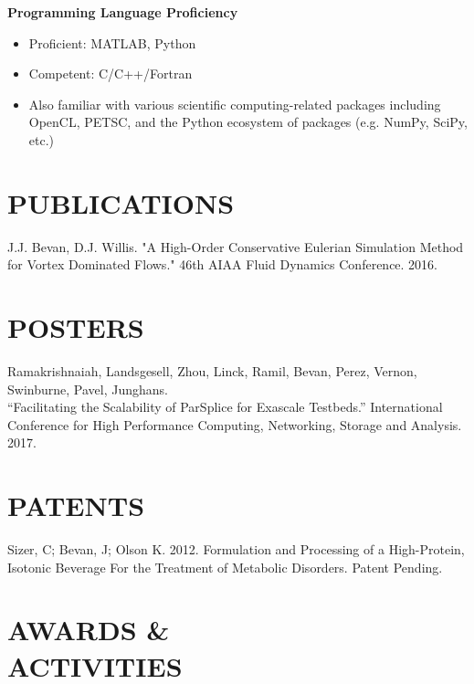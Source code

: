 \documentclass[margin, 10pt]{res} %
\begin{document}
\begin{resume}
{\bf Programming Language Proficiency}
\begin{itemize} \itemsep -2pt 
\item Proficient: MATLAB, Python
\item Competent: C/C++/Fortran
\item Also familiar with various scientific computing-related packages including OpenCL, PETSC, and the Python ecosystem of packages (e.g. NumPy, SciPy, etc.)
\end{itemize}
\section{PUBLICATIONS}

J.J. Bevan, D.J. Willis. "A High-Order Conservative Eulerian Simulation Method for Vortex Dominated Flows." 46th AIAA Fluid Dynamics Conference. 2016.

\section{POSTERS}

 Ramakrishnaiah, Landsgesell, Zhou, Linck, Ramil, Bevan, Perez, Vernon, Swinburne, Pavel, Junghans.\\ ``Facilitating the Scalability of ParSplice for Exascale Testbeds.'' International Conference for High Performance Computing, Networking, Storage and Analysis. 2017.
\section{PATENTS} 

Sizer, C; Bevan, J; Olson K. 2012. Formulation and Processing of a High-Protein, Isotonic Beverage For the Treatment of Metabolic Disorders. Patent Pending.
 

\section{AWARDS \& \\ACTIVITIES} 


\end{resume}
\end{document}
